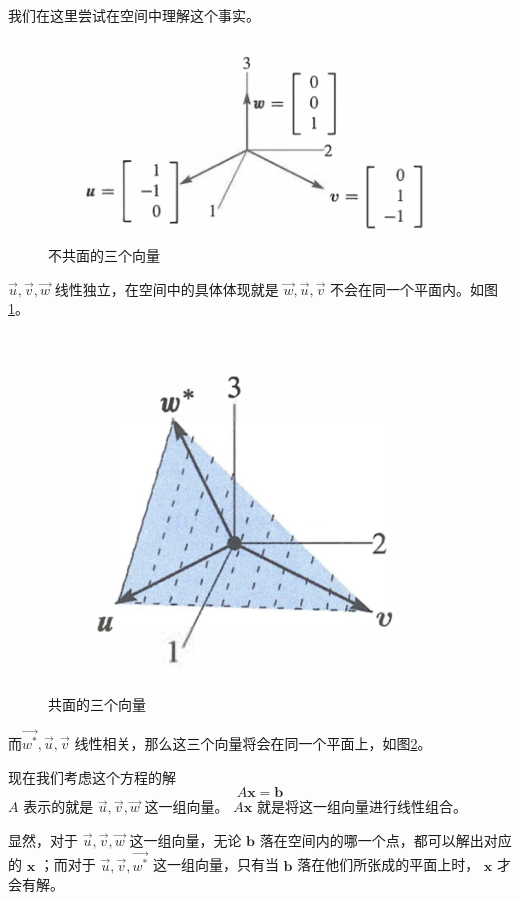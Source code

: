 我们在这里尝试在空间中理解这个事实。

\begin{figure}[h]
	\centering
	\includegraphics[width=0.7\linewidth]{"../img/Pasted image 20231015142207"}
	\caption{不共面的三个向量}
	\label{image_vector_not_relative}
\end{figure}


$\vec u,\vec v,\vec w$ 线性独立，在空间中的具体体现就是 $\vec w,\vec u,\vec v$ 不会在同一个平面内。如图\ref{image_vector_not_relative}。

\begin{figure}[h]
	\centering
	\includegraphics[width=0.7\linewidth]{"../img/Pasted image 20231015142417"}
	\caption{共面的三个向量}
	\label{image_vector_relative}
\end{figure}


而$\vec{w^*},\vec u,\vec v$ 线性相关，那么这三个向量将会在同一个平面上，如图\ref{image_vector_relative}。

现在我们考虑这个方程的解
$$
A\mathbf x=\mathbf b
$$
$A$ 表示的就是 $\vec u,\vec v,\vec w$ 这一组向量。 $A\mathbf x$ 就是将这一组向量进行线性组合。

显然，对于 $\vec u,\vec v,\vec w$ 这一组向量，无论 $\mathbf b$ 落在空间内的哪一个点，都可以解出对应的 $\mathbf x$ ；而对于 $\vec u,\vec v,\vec{w^*}$ 这一组向量，只有当 $\mathbf b$ 落在他们所张成的平面上时， $\mathbf x$ 才会有解。

